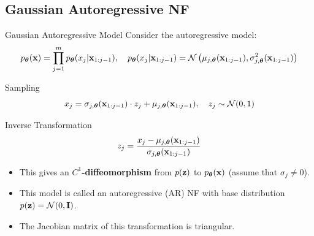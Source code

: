 \documentclass{beamer}
\begin{document}
\subsection{Gaussian Autoregressive NF}
\begin{frame}{Gaussian Autoregressive Model}
	Consider the autoregressive model:
	\vspace{-0.3cm}
	{\small
		\[
		p_{\boldsymbol{\theta}}(\mathbf{x}) = \prod_{j=1}^m p_{\boldsymbol{\theta}}(x_j | \mathbf{x}_{1:j-1}), \quad
		p_{\boldsymbol{\theta}}(x_j | \mathbf{x}_{1:j-1}) = \mathcal{N} \left(\mu_{j, \boldsymbol{\theta}}(\mathbf{x}_{1:j-1}), \sigma^2_{j, \boldsymbol{\theta}} (\mathbf{x}_{1:j-1})\right)
		\]
	}
	\vspace{-0.5cm}
	\eqpause
	\begin{block}{Sampling}
		\vspace{-0.3cm}
		\[
		x_j = \sigma_{j, \boldsymbol{\theta}} (\mathbf{x}_{1:j-1}) \cdot z_j + \mu_{j, \boldsymbol{\theta}}(\mathbf{x}_{1:j-1}), \quad z_j \sim \mathcal{N}(0, 1)
		\]
		\vspace{-0.7cm}
	\end{block}
	\eqpause
	\begin{block}{Inverse Transformation}
		\vspace{-0.5cm}
		\[
		z_j = \frac{x_j - \mu_{j, \boldsymbol{\theta}}(\mathbf{x}_{1:j-1})}{\sigma_{j, \boldsymbol{\theta}} (\mathbf{x}_{1:j-1}) }
		\]
		\vspace{-0.4cm}
	\end{block}
	\eqpause
	\begin{itemize}
		\item This gives an \textbf{$C^1$-diffeomorphism} from $p(\mathbf{z})$ to $p_{\boldsymbol{\theta}}(\mathbf{x})$ (assume that $\sigma_j \neq 0$).
		    \eqpause
		\item This model is called an autoregressive (AR) NF with base distribution $p(\mathbf{z}) = \mathcal{N}(0, \mathbf{I})$.
		    \eqpause
		\item The Jacobian matrix of this transformation is triangular.
	\end{itemize}
\end{frame}
\end{document}
